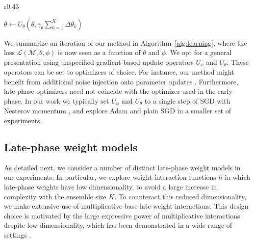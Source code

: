 \documentclass{article} \usepackage{iclr2021_conference,times}
\begin{document}
\setlength\intextsep{0pt}
\begin{wrapfigure}{r}{0.43\textwidth}
    \begin{minipage}{0.43\textwidth}
    \begin{algorithm}[H]
      

      $\theta \gets U_\theta(\theta, \gamma_\theta \sum_{k=1}^K \Delta \theta_k)$
      \caption{Late-phase learning\label{alg:learning}}
     \end{algorithm}
    \end{minipage}
\end{wrapfigure}
We summarize an iteration of our method in Algorithm~\ref{alg:learning}, where the loss $\mathcal{L}(\mathcal{M}, \theta, \phi)$ is now seen as a function of $\theta$ and $\phi$. We opt for a general presentation using unspecified gradient-based update operators $U_\phi$ and $U_\theta$. These operators can be set to optimizers of choice. For instance, our method might benefit from additional noise injection onto parameter updates \citep{welling_bayesian_2011}. Furthermore, late-phase optimizers need not coincide with the optimizer used in the early phase. In our work we typically set $U_{\phi}$ and $U_\theta$ to a single step of SGD with Nesterov momentum \citep{nesterov_introductory_2004}, and explore Adam \citep{kingma_adam:_2015} and plain SGD in a smaller set of experiments.



\subsection{Late-phase weight models}
\label{section:late-phase-models}
As detailed next, we consider a number of distinct late-phase weight models in our experiments. In particular, we explore weight interaction functions $h$ in which late-phase weights have low dimensionality, to avoid a large increase in complexity with the ensemble size $K$. To counteract this reduced dimensionality, we make extensive use of multiplicative base-late weight interactions. This design choice is motivated by the large expressive power of multiplicative interactions despite low dimensionality, which has been demonstrated in a wide range of settings \citep{jayakumar_multiplicative_2020}.
\end{document}
